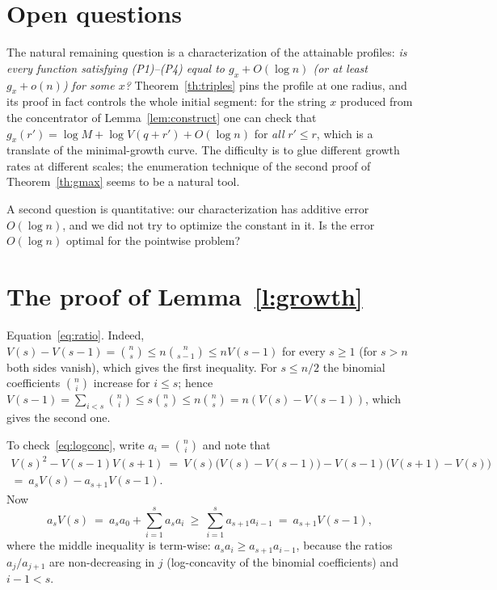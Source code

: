 \documentclass[11pt,a4paper]{article}
\theoremstyle{definition}
\renewcommand{\le}{\leqslant}
\renewcommand{\ge}{\geqslant}
\begin{document}
\section{Open questions}\label{sec:open}

The natural remaining question is a characterization of the attainable
profiles: \emph{is every function satisfying (P1)--(P4) equal to $g_x+O(\log
n)$ (or at least $g_x+o(n)$) for some $x$?} Theorem~\ref{th:triples} pins the
profile at one radius, and its proof in fact controls the whole initial
segment: for the string $x$ produced from the concentrator of
Lemma~\ref{lem:construct} one can check that $g_x(r')=\log M+\log
V(q+r')+O(\log n)$ for \emph{all} $r'\le r$, which is a translate of the
minimal-growth curve. The difficulty is to glue different growth rates at
different scales; the enumeration technique of the second proof of
Theorem~\ref{th:gmax} seems to be a natural tool.

A second question is quantitative: our characterization has additive error
$O(\log n)$, and we did not try to optimize the constant in it. Is the error
$O(\log n)$ optimal for the pointwise problem?

\section{The proof of Lemma~\ref{l:growth}}\label{proof:l2}
Equation~\eqref{eq:ratio}. Indeed, $V(s)-V(s-1)=\binom ns\le n\binom n{s-1}\le nV(s-1)$ for every
$s\ge1$ (for $s>n$ both sides vanish), which gives the first inequality. For $s\le n/2$ the binomial coefficients
$\binom ni$ increase for $i\le s$; hence
$V(s-1)=\sum_{i<s}\binom ni\le s\binom ns\le n\binom ns=n(V(s)-V(s-1))$,
which gives the second one.

To check~\eqref{eq:logconc}, write $a_i=\binom ni$ and note
that
\begin{multline*}
  V(s)^2-V(s-1)V(s+1)\ =\
  V(s)\bigl(V(s)-V(s-1)\bigr)-V(s-1)\bigl(V(s+1)-V(s)\bigr)\\
  =\ a_sV(s)-a_{s+1}V(s-1).
\end{multline*}
Now
\[
  a_sV(s)\ =\ a_sa_0+\sum_{i=1}^{s}a_sa_i\ \ge\ \sum_{i=1}^{s}a_{s+1}a_{i-1}
  \ =\ a_{s+1}V(s-1),
\]
where the middle inequality is term-wise: $a_sa_i\ge a_{s+1}a_{i-1}$, because
the ratios $a_j/a_{j+1}$ are non-decreasing in $j$ (log-concavity of the
binomial coefficients) and $i-1<s$.
\end{document}
